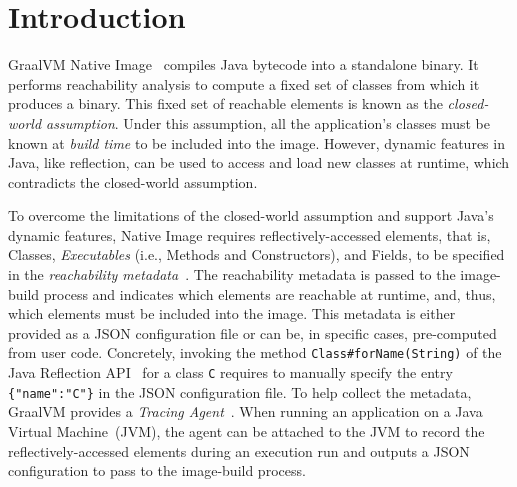 \chapter{Introduction}


GraalVM Native Image~\cite{noauthor_native_nodate} compiles Java bytecode into a standalone binary. It performs reachability analysis to compute a fixed set of classes from which it produces a binary. 
This fixed set of reachable elements is known as the \emph{closed-world assumption}. Under this assumption, all the application's classes must be known at \emph{build time} to be included into the image.
However, dynamic features in Java, like reflection, can be used to access and load new classes at runtime, which contradicts the closed-world assumption. 

To overcome the limitations of the closed-world assumption and support Java's dynamic features, Native Image requires reflectively-accessed elements, that is, Classes, \emph{Executables} (i.e., Methods and Constructors), and Fields, to be specified in the \emph{reachability metadata}~\cite{noauthor_reachability_nodate}. The reachability metadata is passed to the image-build process and indicates which elements are reachable at runtime, and, thus, which elements must be included into the image. This metadata is either provided as a JSON configuration file or can be, in specific cases, pre-computed from user code. Concretely, invoking the method \verb|Class#forName(String)| of the Java Reflection API~\cite{noauthor_core_nodate} for a class \verb|C| requires to manually specify the entry \verb|{"name":"C"}| in the JSON configuration file.
To help collect the metadata, GraalVM provides a \emph{Tracing Agent}~\cite{noauthor_collect_nodate}. When running an application on a Java Virtual Machine~(JVM), the agent can be attached to the JVM to record the reflectively-accessed elements during an execution run and outputs a JSON configuration to pass to the image-build process.

